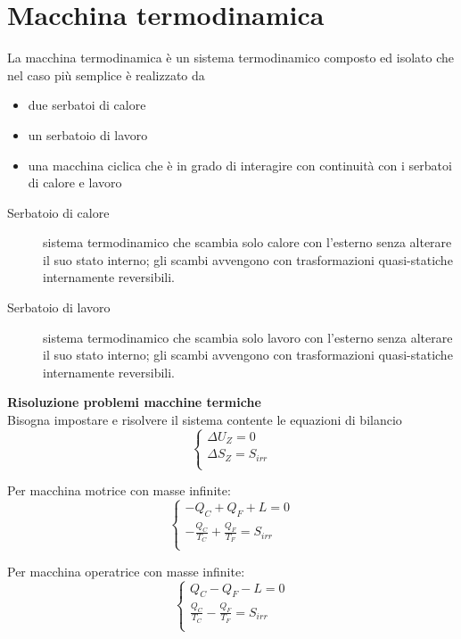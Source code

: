 \section{Macchina termodinamica}
La macchina termodinamica è un sistema termodinamico composto ed isolato che nel caso più semplice è realizzato da
\begin{itemize}
\item due serbatoi di calore
\item un serbatoio di lavoro
\item una macchina ciclica che è in grado di interagire con continuità con i serbatoi di calore e lavoro
\end{itemize}

\begin{description}
\item[Serbatoio di calore]
sistema termodinamico che scambia solo calore con l'esterno senza alterare il suo stato interno;
gli scambi avvengono con trasformazioni quasi-statiche internamente reversibili.
\item[Serbatoio di lavoro]
sistema termodinamico che scambia solo lavoro con l'esterno senza alterare il suo stato interno;
gli scambi avvengono con trasformazioni quasi-statiche internamente reversibili.
\end{description}

\textbf{Risoluzione problemi macchine termiche}\\
Bisogna impostare e risolvere il sistema contente le equazioni di bilancio
\[
    \begin{cases}
    \Delta U_Z = 0 \\
    \Delta S_Z = S_{irr} \\
    \end{cases}
\]

Per macchina motrice con masse infinite:
\[
    \begin{cases}
        -Q_C + Q_F + L = 0 \\
        -\frac{Q_C}{T_C} + \frac{Q_F}{T_F} = S_{irr} \\
    \end{cases}
\]

Per macchina operatrice con masse infinite:
\[
    \begin{cases}
        Q_C - Q_F - L = 0 \\
        \frac{Q_C}{T_C} - \frac{Q_F}{T_F} = S_{irr} \\
    \end{cases}
\]

